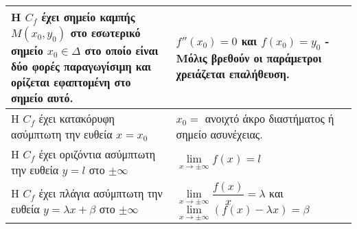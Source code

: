 \documentclass[ektypwsh]{frontisthrio}
\begin{document}
\begin{center}
\begin{tabular}{p{7.5cm}|p{7.5cm}}
\hline
\rule[-2ex]{0pt}{5.5ex} Η $ C_f $ έχει \textbf{σημείο καμπής} $ M(x_0,y_0) $ στο \textbf{εσωτερικό} σημείο $ x_0\in\Delta $ στο οποίο είναι \textbf{δύο φορές παραγωγίσιμη} και \textbf{ορίζεται εφαπτομένη} στο σημείο αυτό. & $ f''(x_0)=0 $ και $ f(x_0)=y_0 $ - Μόλις βρεθούν οι παράμετροι χρειάζεται επαλήθευση.\\
\hline
\rule[-2ex]{0pt}{5.5ex} Η $ C_f $ έχει κατακόρυφη ασύμπτωτη την ευθεία $ x=x_0 $ & $ x_0= $ ανοιχτό άκρο διαστήματος ή σημείο ασυνέχειας. \\
\hline
\rule[-2ex]{0pt}{5.5ex} Η $ C_f $ έχει οριζόντια ασύμπτωτη την ευθεία $ y=l $ στο $ \pm\infty $ & $ \lim\limits_{x\to \pm\infty}{f(x)}=l $ \\
\hline
\rule[-1ex]{0pt}{5.5ex} Η $ C_f $ έχει πλάγια ασύμπτωτη την ευθεία $ y=\lambda x+\beta $ στο $ \pm\infty $ & $ \lim\limits_{x\to\pm\infty}{\dfrac{f(x)}{x}}=\lambda $ και $ \lim\limits_{x\to \pm\infty}{(f(x)-\lambda x)}=\beta $\\
\hline
\end{tabular}
\end{center}

\newpage
\end{document}
